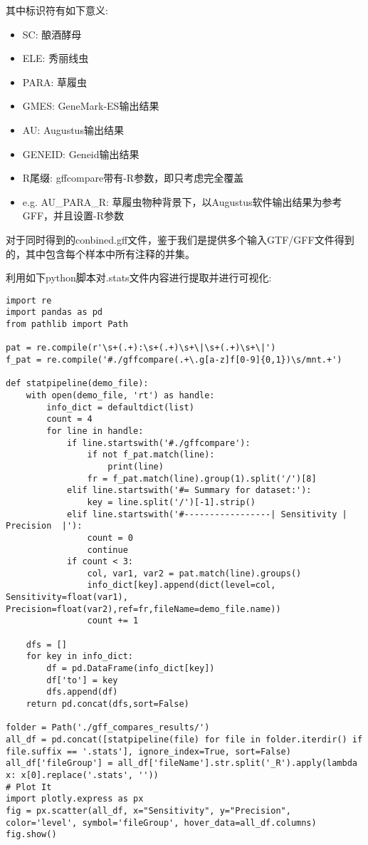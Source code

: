 \documentclass[12pt]{ctexart}
\begin{document}
其中标识符有如下意义:

\begin{itemize}
    \item SC: 酿酒酵母
    \item ELE: 秀丽线虫
    \item PARA: 草履虫
    \item GMES: GeneMark-ES输出结果
    \item AU: Augustus输出结果
    \item GENEID: Geneid输出结果
    \item R尾缀: gffcompare带有-R参数，即只考虑完全覆盖
    \item e.g. AU\_PARA\_R: 草履虫物种背景下，以Augustus软件输出结果为参考GFF，并且设置-R参数
\end{itemize}

对于同时得到的conbined.gff文件，鉴于我们是提供多个输入GTF/GFF文件得到的，其中包含每个样本中所有注释的并集。\citep{pmid32489650}

利用如下python脚本对.stats文件内容进行提取并进行可视化:

\begin{lstlisting}
import re
import pandas as pd
from pathlib import Path

pat = re.compile(r'\s+(.+):\s+(.+)\s+\|\s+(.+)\s+\|')
f_pat = re.compile('#./gffcompare(.+\.g[a-z]f[0-9]{0,1})\s/mnt.+')

def statpipeline(demo_file):
    with open(demo_file, 'rt') as handle:
        info_dict = defaultdict(list)
        count = 4
        for line in handle:
            if line.startswith('#./gffcompare'):
                if not f_pat.match(line):
                    print(line)
                fr = f_pat.match(line).group(1).split('/')[8]
            elif line.startswith('#= Summary for dataset:'):
                key = line.split('/')[-1].strip()
            elif line.startswith('#-----------------| Sensitivity | Precision  |'):
                count = 0
                continue
            if count < 3:
                col, var1, var2 = pat.match(line).groups()
                info_dict[key].append(dict(level=col, Sensitivity=float(var1), Precision=float(var2),ref=fr,fileName=demo_file.name))
                count += 1

    dfs = []
    for key in info_dict:
        df = pd.DataFrame(info_dict[key])
        df['to'] = key
        dfs.append(df)
    return pd.concat(dfs,sort=False)

folder = Path('./gff_compares_results/')
all_df = pd.concat([statpipeline(file) for file in folder.iterdir() if file.suffix == '.stats'], ignore_index=True, sort=False)
all_df['fileGroup'] = all_df['fileName'].str.split('_R').apply(lambda x: x[0].replace('.stats', ''))
# Plot It
import plotly.express as px
fig = px.scatter(all_df, x="Sensitivity", y="Precision", color='level', symbol='fileGroup', hover_data=all_df.columns)
fig.show()
\end{lstlisting}
\end{document}
